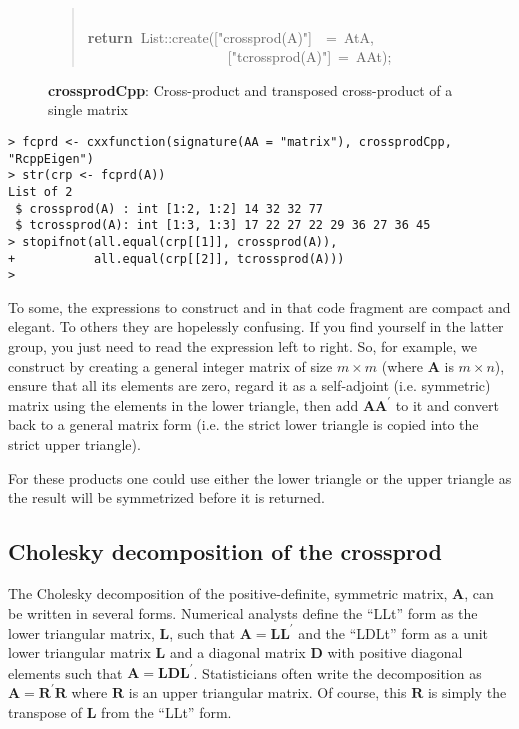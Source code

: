 \documentclass[shortnames,article]{jss}
\newcommand{\hlstd}[1]{\textcolor[rgb]{0,0,0}{#1}}
\newcommand{\hlopt}[1]{\textcolor[rgb]{0,0,0}{#1}}
\newcommand{\hlstr}[1]{\textcolor[rgb]{0.90,0.15,0.15}{#1}}
\newcommand{\hlkwa}[1]{\textcolor[rgb]{0.61,0.13,0.93}{\bf{#1}}}
\newcommand{\hlkwd}[1]{\textcolor[rgb]{0,0,0}{#1}}
\begin{document}
\begin{figure}[htb]
\begin{quote}
    \hlstd{}\hspace*{\fill}\\
    \hlkwa{return\ }\hlstd{List}\hlopt{::}\hlstd{}\hlkwd{create}\hlstd{}\hlopt{(}\hlstd{\textunderscore }\hlopt{{[}}\hlstd{}\hlstr{"crossprod(A)"}\hlstd{}\hlopt{{]}}\hlstd{\ \ }\hlopt{=\ }\hlstd{AtA}\hlopt{,}\hspace*{\fill}\\
    \hlstd{}\hlstd{\ \ \ \ \ \ \ \ \ \ \ \ \ \ \ \ \ \ \ \ }\hlstd{\textunderscore }\hlopt{{[}}\hlstd{}\hlstr{"tcrossprod(A)"}\hlstd{}\hlopt{{]}\ =\ }\hlstd{AAt}\hlopt{);}\hlstd{}\hspace*{\fill}
    \normalfont
    \normalsize
  \end{quote}
  \caption{\textbf{crossprodCpp}: Cross-product and transposed cross-product of a single matrix}
  \label{crossprod}
\end{figure}
\begin{verbatim}
> fcprd <- cxxfunction(signature(AA = "matrix"), crossprodCpp, "RcppEigen")
> str(crp <- fcprd(A))
List of 2
 $ crossprod(A) : int [1:2, 1:2] 14 32 32 77
 $ tcrossprod(A): int [1:3, 1:3] 17 22 27 22 29 36 27 36 45
> stopifnot(all.equal(crp[[1]], crossprod(A)),
+           all.equal(crp[[2]], tcrossprod(A)))
> 
\end{verbatim}

To some, the expressions to construct  and  in
that code fragment are compact and elegant.  To others they are
hopelessly confusing.  If you find yourself in the latter group, you
just need to read the expression left to right.  So, for example, we
construct  by creating a general integer matrix of size
$m\times m$ (where $\bm A$ is $m\times n$), ensure that all its
elements are zero, regard it as a self-adjoint (i.e. symmetric) matrix
using the elements in the lower triangle, then add $\bm A\bm A^\prime$
to it and convert back to a general matrix form (i.e. the strict
lower triangle is copied into the strict upper triangle).

For these products one could use either the lower triangle or the upper
triangle as the result will be symmetrized before it is returned.



\subsection{Cholesky decomposition of the crossprod}
\label{sec:chol}

The Cholesky decomposition of the positive-definite, symmetric matrix,
$\bm A$, can be written in several forms.  Numerical analysts define
the ``LLt'' form as the lower triangular matrix, $\bm L$, such that
$\bm A=\bm L\bm L^\prime$ and the ``LDLt'' form as a unit lower
triangular matrix $\bm L$ and a diagonal matrix $\bm D$ with positive
diagonal elements such that $\bm A=\bm L\bm D\bm L^\prime$.
Statisticians often write the decomposition as $\bm A=\bm R^\prime\bm
R$ where $\bm R$ is an upper triangular matrix.  Of course, this $\bm
R$ is simply the transpose of $\bm L$ from the ``LLt'' form.
\end{document}

